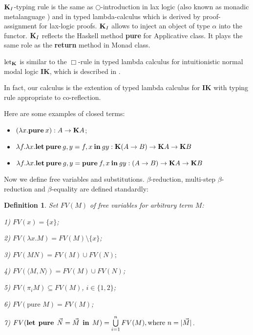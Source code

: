 \documentclass[a4paper]{article}
\newtheorem{defin}{Definition}
\begin{document}
  ${\bf K}_I$-typing rule is the same as $\bigcirc$-introduction in lax logic (also known as monadic
  metalanguage \cite{Lax}) and in typed lambda-calculus which is derived by proof-assignment for lax-logic
  proofs.
  ${\bf K}_I$ allows to inject an object of type $\alpha$ into the functor. ${\bf K}_I$  reflects the
  Haskell method {\bf pure} for Applicative class. It plays the same role as the {\bf return} method in Monad class.

  $\text{let}_{{\bf K}}$ is similar to the $\Box$-rule in typed lambda calculus for intuitionistic normal modal logic {\bf IK}, which is described in \cite{ModalK}.

  In fact, our calculus is the extention of typed lambda calculus for {\bf IK} with typing rule appropriate to co-reflection.

  \vspace{\baselineskip}

Here are some examples of closed terms:

\begin{itemize}
\item $(\lambda x. {\bf pure \: } x) : A \to {\bf K}A$;
\item $\lambda f. \lambda x. {\bf let \: pure} \: g, y  = f, x {\: \bf in \:} g y : {\bf K}(A \to B) \to {\bf K} A \to {\bf K} B$
\item $\lambda f. \lambda x. {\bf let \:pure} \: g, y = {\bf pure \:} f, x  {\: \bf in \: } g y : (A \to B) \to {\bf K} A \to {\bf K} B$
\end{itemize}

  \vspace{\baselineskip}

  Now we define free variables and substitutions. $\beta$-reduction, multi-step $\beta$-reduction and $\beta$-equality are defined standardly:

  \begin{defin} Set $FV(M)$ of free variables for arbitrary term $M$:

  1) $FV(x) = \{ x \}$;

  2) $FV(\lambda x. M) = FV(M) \setminus \{ x\}$;

  3) $FV(M N) = FV(M) \cup FV(N);$

  4) $FV(\langle M,N \rangle) = FV(M) \cup FV(N)$;

  5) $FV(\pi_i M) \subseteq FV(M)$, $i \in \{ 1, 2\}$;

  6) $FV(\text{pure } M) = FV(M)$;

  7) $FV({\bf let \:\: pure} \:\: \vec{N} = \vec{M} \:\: {\bf in} \:\: M) = \bigcup \limits_{i = 1}^n FV(M), \text{where $n = |\vec{M}|$}$.
  \end{defin}
\end{document}
